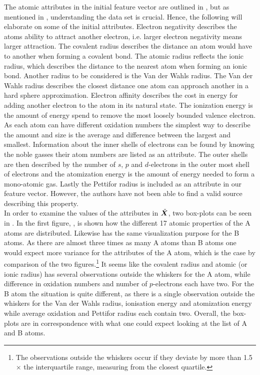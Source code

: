 The atomic attributes in the initial feature vector are outlined in , but as mentioned in , understanding the data set is crucial. Hence, the following will elaborate on some of the initial attributes. Electron negativity describes the atoms ability to attract another electron, i.e. larger electron negativity means larger attraction. The covalent radius describes the distance an atom would have to another when forming a covalent bond. The atomic radius reflects the ionic radius, which describes the distance to the nearest atom when forming an ionic bond. Another radius to be considered is the Van der Wahls radius. The Van der Wahls radius describes the closest distance one atom can approach another in a hard sphere approximation. Electron affinity describes the cost in energy for adding another electron to the atom in its natural state. The ionization energy is the amount of energy spend to remove the most loosely bounded valence electron. As each atom can have different oxidation numbers the simplest way to describe the amount and size is the average and difference between the largest and smallest. Information about the inner shells of electrons can be found by knowing the noble gasses their atom numbers are listed as an attribute. The outer shells are then described by the number of $s$, $p$ and $d$-electrons in the outer most shell of electrons and the atomization energy is the amount of energy needed to form a mono-atomic gas. Lastly the Pettifor radius is included as an attribute in our feature vector. However, the authors have not been able to find a valid source describing this property. \\

In order to examine the values of the attributes in $\tilde{\bm{X}}$, two box-plots can be seen in . In the first figure, , is shown how the different 17 atomic properties of the A atoms are distributed. Likewise   has the same visualization purpose for the B atoms. As there are almost three times as many A atoms than B atoms one would expect more variance for the attributes of the A atom, which is the case by comparison of the two figures.\footnote{The observations outside the whiskers occur if they deviate by more than 1.5 $\times$ the interquartile range, measuring from the closest quartile.} It seems like the covalent radius and atomic (or ionic radius) has several observations outside the whiskers for the A atom, while difference in oxidation numbers and number of $p$-electrons each have two. For the B atom the situation is quite different, as there is a single observation outside the whiskers for the Van der Wahls radius, ionisation energy and atomization energy while average oxidation and Pettifor radius each contain two. Overall, the box-plots are in correspondence with what one could expect looking at the list of A and B atoms.


